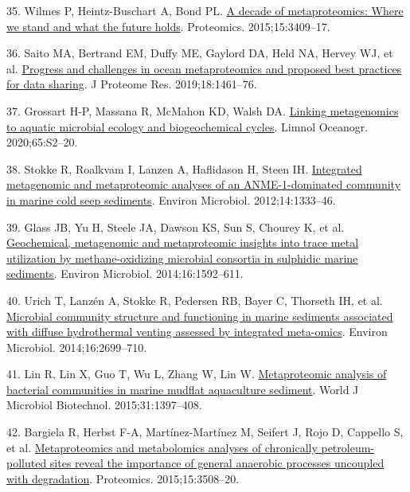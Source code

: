 \documentclass[
  12 pt,
]{article}
\newlength{\cslhangindent}
\newlength{\cslentryspacingunit} %
\newenvironment{CSLReferences}[2] %
 {%
  \setlength{\parindent}{0pt}
  \ifodd #1
  \let\oldpar\par
  \def\par{\hangindent=\cslhangindent\oldpar}
  \fi
  \setlength{\parskip}{#2\cslentryspacingunit}
 }%
 {}
\begin{document}
\begin{CSLReferences}{0}{0}
\leavevmode{}%
35. Wilmes P, Heintz-Buschart A, Bond PL. \href{https://doi.org/10.1002/pmic.201500183}{A decade of metaproteomics: Where we stand and what the future holds}. Proteomics. 2015;15:3409--17.

\leavevmode{}%
36. Saito MA, Bertrand EM, Duffy ME, Gaylord DA, Held NA, Hervey WJ, et al. \href{https://doi.org/10.1021/acs.jproteome.8b00761}{Progress and challenges in ocean metaproteomics and proposed best practices for data sharing}. J Proteome Res. 2019;18:1461--76.

\leavevmode{}%
37. Grossart H-P, Massana R, McMahon KD, Walsh DA. \href{https://doi.org/10.1002/lno.11382}{Linking metagenomics to aquatic microbial ecology and biogeochemical cycles}. Limnol Oceanogr. 2020;65:S2--20.

\leavevmode{}%
38. Stokke R, Roalkvam I, Lanzen A, Haflidason H, Steen IH. \href{https://doi.org/10.1111/j.1462-2920.2012.02716.x}{Integrated metagenomic and metaproteomic analyses of an {ANME-1-dominated} community in marine cold seep sediments}. Environ Microbiol. 2012;14:1333--46.

\leavevmode{}%
39. Glass JB, Yu H, Steele JA, Dawson KS, Sun S, Chourey K, et al. \href{https://doi.org/10.1111/1462-2920.12314}{Geochemical, metagenomic and metaproteomic insights into trace metal utilization by methane-oxidizing microbial consortia in sulphidic marine sediments}. Environ Microbiol. 2014;16:1592--611.

\leavevmode{}%
40. Urich T, Lanzén A, Stokke R, Pedersen RB, Bayer C, Thorseth IH, et al. \href{https://doi.org/10.1111/1462-2920.12283}{Microbial community structure and functioning in marine sediments associated with diffuse hydrothermal venting assessed by integrated meta-omics}. Environ Microbiol. 2014;16:2699--710.

\leavevmode{}%
41. Lin R, Lin X, Guo T, Wu L, Zhang W, Lin W. \href{https://doi.org/10.1007/s11274-015-1891-5}{Metaproteomic analysis of bacterial communities in marine mudflat aquaculture sediment}. World J Microbiol Biotechnol. 2015;31:1397--408.

\leavevmode{}%
42. Bargiela R, Herbst F-A, Martínez-Martínez M, Seifert J, Rojo D, Cappello S, et al. \href{https://doi.org/10.1002/pmic.201400614}{Metaproteomics and metabolomics analyses of chronically petroleum-polluted sites reveal the importance of general anaerobic processes uncoupled with degradation}. Proteomics. 2015;15:3508--20.


\end{CSLReferences}
\end{document}
